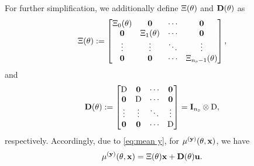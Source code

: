 For further simplification, we additionally 
define $\Xi({ \mathrm{\theta} })$ and $\mathbf{D}({ \mathrm{\theta} })$ as  
\begin{equation}
    \Xi(\vctheta) := \begin{bmatrix}
        \Xi_0(\vctheta) & \mathbf{0} & \cdots & \mathbf{0}\\
        \mathbf{0} & \Xi_1(\vctheta) & \cdots & \mathbf{0}\\
        \vdots & \vdots & \ddots & \vdots\\
        \mathbf{0} & \mathbf{0} & \cdots & \Xi_{\nsD-1}(\vctheta)\\
    \end{bmatrix},
\end{equation}
and
\begin{equation}
    \mathbf{D}(\vctheta) := 
    \begin{bmatrix}
        \mxD & \mathbf{0} & \cdots & \mathbf{0}\\
        \mathbf{0} & \mxD & \cdots & \mathbf{0}\\
        \vdots & \vdots & \ddots & \vdots\\
        \mathbf{0} & \mathbf{0} & \cdots & \mxD\\
    \end{bmatrix}
    = \mathbf{I}_\nsD \otimes \mxD,
\end{equation}
respectively.
Accordingly, due to \eqref{eq:mean y}, for $\mu^{(\mathbf{y})}({{ \mathrm{\theta} }},\mathbf{x})$, 
we have 
\begin{equation}
\mu^{(\mathbf{y})}({{ \mathrm{\theta} }},\mathbf{x}) = \Xi({ \mathrm{\theta} })\mathbf{x} + \mathbf{D}({ \mathrm{\theta} })\mathbf{u}.
\end{equation}

